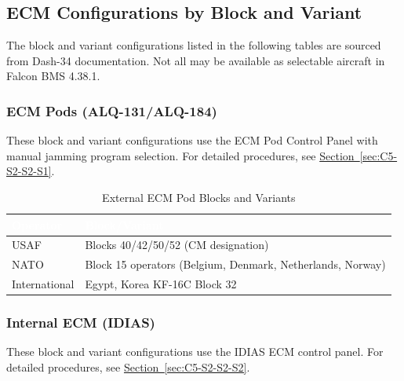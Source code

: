 \documentclass[11pt, a4paper, twoside]{report}
\newcommand{\secref}[1]{\hyperref[#1]{Section~\ref*{#1}}}
\begin{document}
\subsection{ECM Configurations by Block and Variant}
\label{sec:C5-S3-S1}

The block and variant configurations listed in the following tables are sourced from Dash-34 documentation. Not all may be available as selectable aircraft in Falcon BMS 4.38.1.

\subsubsection{ECM Pods (ALQ-131/ALQ-184)}
\label{sec:C5-S3-S1-S1}

These block and variant configurations use the ECM Pod Control Panel with manual jamming program selection. For detailed procedures, see \secref{sec:C5-S2-S2-S1}.

\begin{table}[H]
\centering
\caption{External ECM Pod Blocks and Variants}
\label{tab:C5-S3-external-ecm-pods}
\small
\renewcommand{\arraystretch}{1.25}
\begin{tabular}{|>{\raggedright\arraybackslash}p{3.0cm}|>{\raggedright\arraybackslash}p{5.8cm}|}
\hline
\rowcolor{headerblue}
\textcolor{white}{\textbf{Operator}} & \textcolor{white}{\textbf{Block/Variant}} \\
\hline
USAF & Blocks 40/42/50/52 (CM designation) \\
\hline
NATO & Block 15 operators (Belgium, Denmark, Netherlands, Norway) \\
\hline
International & Egypt, Korea KF-16C Block 32 \\
\hline
\end{tabular}
\end{table}

\subsubsection{Internal ECM (IDIAS)}
\label{sec:C5-S3-S1-S2}

These block and variant configurations use the IDIAS ECM control panel. For detailed procedures, see \secref{sec:C5-S2-S2-S2}.
\end{document}
